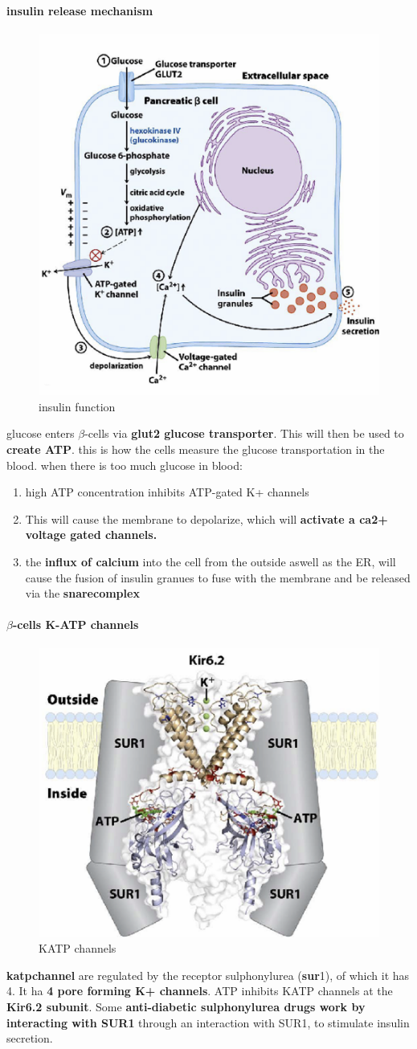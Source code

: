 \documentclass[../main.tex]{subfiles}
\begin{document}
\paragraph{insulin release mechanism}
\begin{figure}[H]
    \centering
    \includegraphics[width=0.5\linewidth]{betaCells.png}
    \caption{insulin function}
    \label{fig:enter-label}
\end{figure}
glucose enters $\beta$-cells via \textbf{glut2 glucose transporter}. This will then be used to \textbf{create ATP}. this is how the cells measure the glucose transportation in the blood. when there is too much glucose in blood:
\begin{enumerate}
    \item high ATP concentration inhibits ATP-gated K+ channels
    \item This will cause the membrane to depolarize, which will\textbf{ activate a ca2+ voltage gated channels. }
    \item the \textbf{influx of calcium} into the cell from the outside aswell as the ER, will cause the fusion of insulin granues to fuse with the membrane and be released via the \textbf{\gls{snarecomplex}}
\end{enumerate}
\paragraph{$\beta$-cells K-ATP channels}
\begin{figure}[H]
    \centering
    \includegraphics[width=0.5\linewidth]{KATPCHannel.png}
    \caption{KATP channels}
    \label{fig:enter-label}
\end{figure}
\textbf{\gls{katpchannel}} are regulated by the receptor sulphonylurea (\textbf{\gls{sur}}1), of which it has 4. It ha\textbf{ 4 pore forming K+ channels}. ATP inhibits KATP 
channels at the \textbf{Kir6.2 subunit}. Some \textbf{anti-diabetic sulphonylurea drugs work by interacting with SUR1 }
through an interaction with SUR1, to stimulate insulin secretion.
\end{document}
